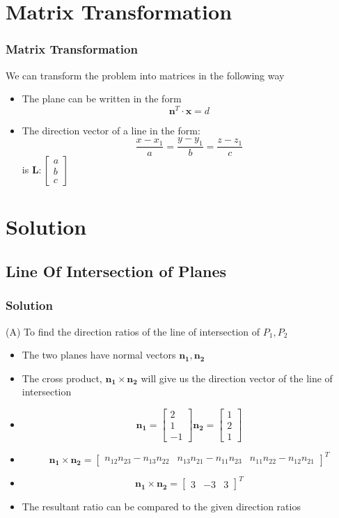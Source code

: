 \documentclass{beamer}
\let\vec\mathbf
\begin{document}
\section{Matrix Transformation}
\begin{frame}
\frametitle{Matrix Transformation}
We can transform the problem into matrices in the following way
\begin{itemize}
\item The plane can be written in the form 
    \[
    \vec{n}^{T}\cdot\vec{x}=d
    \]
\item The direction vector of a line in the form: 
    \[
    \frac{x-x_{1}}{a}=\frac{y-y_{1}}{b}=\frac{z-z_{1}}{c}
    \] is $\vec{L}: \begin{bmatrix}a\\b\\c\end{bmatrix}$
\end{itemize}
\end{frame} 
\section{Solution}
\subsection{Line Of Intersection of Planes}
\begin{frame}
\frametitle{Solution}

(A) To find the direction ratios of the line of intersection of $P_{1},P_{2}$
\begin{itemize}
\item The two planes have normal vectors $\vec{n_{1}},\vec{n_{2}}$
\item The cross product, $\vec{n_{1}}\times \vec{n_{2}}$ will give us the direction vector of the line of intersection
\item 
\[  \vec{n_{1}}=
    \begin{bmatrix}
    2\\1\\-1
    \end{bmatrix}
    \vec{n_{2}}=
    \begin{bmatrix}
    1\\2\\1
    \end{bmatrix}
\]
\item 
\[
    \vec{n_{1}}\times \vec{n_{2}}=
    \begin{bmatrix}
    n_{12}n_{23}-n_{13}n_{22} & n_{13}n_{21}-n_{11}n_{23} & n_{11}n_{22}-n_{12}n_{21}
    \end{bmatrix}^{T}
\]
\item 
\[
    \vec{n_{1}}\times \vec{n_{2}}=
    \begin{bmatrix}
    3 & -3 & 3
    \end{bmatrix}^{T}
\]
\item The resultant ratio can be compared to the given direction ratios
\end{itemize}
\end{frame}
\end{document}
